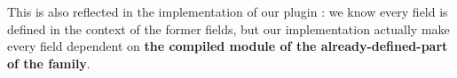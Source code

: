 This is also reflected in the implementation of our plugin : we know every field is defined in the context of the former fields, but our implementation actually make every field dependent on \textbf{the compiled module of the already-defined-part of the family}. 


